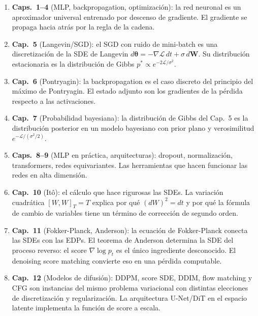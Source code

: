 \begin{enumerate}
  \item \textbf{Caps.\ 1--4} (MLP, backpropagation, optimización): la red
        neuronal es un aproximador universal entrenado por descenso de gradiente.
        El gradiente se propaga hacia atrás por la regla de la cadena.

  \item \textbf{Cap.\ 5} (Langevin/SGD): el SGD con ruido de mini-batch es una
        discretización de la SDE de Langevin $d\bm{\theta} = -\nabla\mathcal{L}
        \,dt + \sigma\,d\bm{W}$. Su distribución estacionaria es la distribución
        de Gibbs $p^*\propto e^{-2\mathcal{L}/\sigma^2}$.

  \item \textbf{Cap.\ 6} (Pontryagin): la backpropagation es el caso discreto
        del principio del máximo de Pontryagin. El estado adjunto son los
        gradientes de la pérdida respecto a las activaciones.

  \item \textbf{Cap.\ 7} (Probabilidad bayesiana): la distribución de Gibbs
        del Cap.\ 5 es la distribución posterior en un modelo bayesiano con
        prior plano y verosimilitud $e^{-\mathcal{L}/(\sigma^2/2)}$.

  \item \textbf{Caps.\ 8--9} (MLP en práctica, arquitecturas): dropout,
        normalización, transformers, redes equivariantes. Las herramientas que
        hacen funcionar las redes en alta dimensión.

  \item \textbf{Cap.\ 10} (Itô): el cálculo que hace rigurosas las SDEs. La
        variación cuadrática $[W,W]_T = T$ explica por qué $(dW)^2 = dt$ y por
        qué la fórmula de cambio de variables tiene un término de corrección de
        segundo orden.

  \item \textbf{Cap.\ 11} (Fokker-Planck, Anderson): la ecuación de Fokker-Planck
        conecta las SDEs con las EDPs. El teorema de Anderson determina la SDE
        del proceso reverso: el score $\nabla\log p_t$ es el único ingrediente
        desconocido. El denoising score matching convierte eso en una pérdida
        computable.

  \item \textbf{Cap.\ 12} (Modelos de difusión): DDPM, score SDE, DDIM, flow
        matching y CFG son instancias del mismo problema variacional con distintas
        elecciones de discretización y regularización. La arquitectura U-Net/DiT
        en el espacio latente implementa la función de score a escala.
\end{enumerate}

